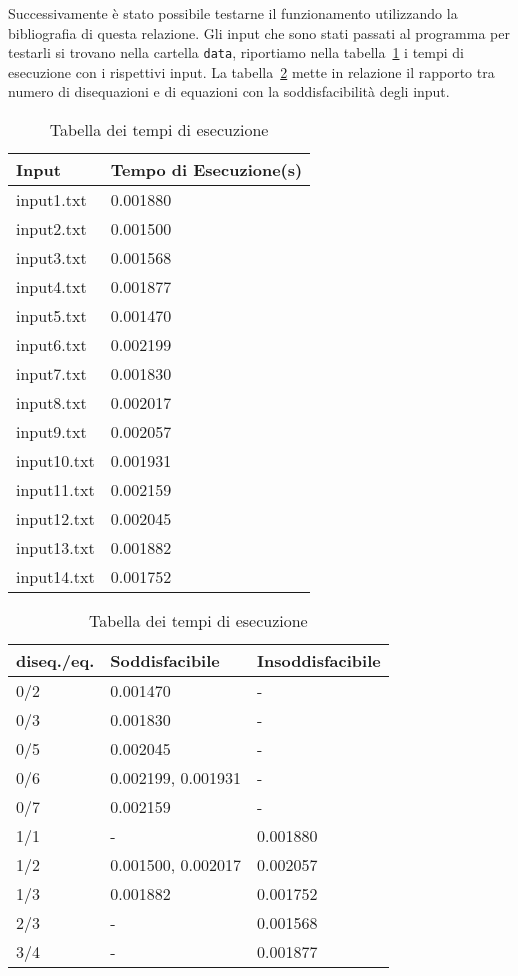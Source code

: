 \documentclass[a4paper, 11pt]{article}
\begin{document}
Successivamente è stato possibile testarne il funzionamento utilizzando la bibliografia di questa relazione. Gli input che sono stati passati al programma per testarli si trovano nella cartella \verb|data|, riportiamo nella tabella~\ref{tab:tempi} i tempi di esecuzione con i rispettivi input. La tabella~\ref{tab:tempi_rapporto} mette in relazione il rapporto tra numero di disequazioni e di equazioni con la soddisfacibilità degli input. 

\begin{table}
\centering
\begin{tabular}{ll}
\toprule
Input & Tempo di Esecuzione(s) \\
\midrule
input1.txt  & 0.001880 \\
input2.txt  & 0.001500 \\
input3.txt  & 0.001568 \\
input4.txt  & 0.001877 \\
input5.txt  & 0.001470 \\
input6.txt  & 0.002199 \\
input7.txt  & 0.001830 \\
input8.txt  & 0.002017 \\
input9.txt  & 0.002057 \\
input10.txt  & 0.001931 \\
input11.txt  & 0.002159 \\
input12.txt  & 0.002045 \\
input13.txt  & 0.001882 \\
input14.txt  & 0.001752 \\
\bottomrule
\end{tabular}
\caption{Tabella dei tempi di esecuzione}
\label{tab:tempi}
\end{table}

\begin{table}
\centering
\begin{tabular}{lll}
\toprule
diseq./eq. & Soddisfacibile & Insoddisfacibile \\
\midrule
0/2 & 0.001470 & - \\
0/3 & 0.001830 & - \\
0/5 & 0.002045 & - \\
0/6 & 0.002199, 0.001931 & - \\
0/7 & 0.002159 & - \\
1/1 & - & 0.001880 \\
1/2 & 0.001500, 0.002017 & 0.002057 \\
1/3 & 0.001882 & 0.001752 \\
2/3 & - & 0.001568 \\
3/4 & - & 0.001877 \\
\bottomrule
\end{tabular}
\caption{Tabella dei tempi di esecuzione}
\label{tab:tempi_rapporto}
\end{table}
\end{document}
